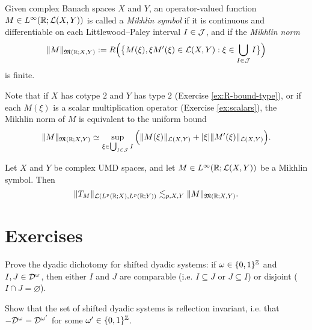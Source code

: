 \begin{defn}
  Given complex Banach spaces $X$ and $Y$, an operator-valued function $M \in L^\infty(\mathbb{R}; \mathcal{L}(X,Y))$ is called a \emph{Mikhlin symbol} if it is continuous and differentiable on each Littlewood--Paley interval $I \in \mathcal{J}$, and if the \emph{Mikhlin norm}
  \begin{equation*}
    \|M\|_{\mathfrak{M}(\mathbb{R};X,Y)} := R \Big( \big\{ M(\xi), \xi M'(\xi) \in \mathcal{L}(X,Y) : \xi \in \bigcup_{I \in \mathcal{J}} I \big\} \Big)
  \end{equation*}
  is finite.
\end{defn}

Note that if $X$ has cotype $2$ and $Y$ has type $2$ (Exercise \ref{ex:R-bound-type}), or if each $M(\xi)$ is a scalar multiplication operator (Exercise \ref{ex:scalars}), the Mikhlin norm of $M$ is equivalent to the uniform bound
\begin{equation*}
  \|M\|_{\mathfrak{M}(\mathbb{R};X,Y)} \simeq \sup_{\xi \in \bigcup_{I \in \mathcal{J}} I} \Big( \|M(\xi)\|_{\mathcal{L}(X,Y)} + |\xi|\|M'(\xi)\|_{\mathcal{L}(X,Y)} \Big).
\end{equation*}

\begin{thm}
  Let $X$ and $Y$ be complex UMD spaces, and let $M \in L^\infty(\mathbb{R};\mathcal{L}(X,Y))$ be a Mikhlin symbol.
  Then
  \begin{equation*}
    \|T_{M}\|_{\mathcal{L}(L^p(\mathbb{R};X), L^p(\mathbb{R};Y))} \lesssim_{p,X,Y} \|M\|_{\mathfrak{M}(\mathbb{R};X,Y)}.
  \end{equation*}
\end{thm}




\section{Exercises}

\begin{exercise}\label{ex:dyadic-dichotomy}
  Prove the dyadic dichotomy for shifted dyadic systems: if $\omega \in \{0,1\}^{\mathbb{Z}}$ and $I,J \in \mathcal{D}^{\omega}$, then either $I$ and $J$ are comparable (i.e. $I \subseteq J$ or $J \subseteq I$) or disjoint ($I \cap J = \varnothing$).
\end{exercise}

\begin{exercise}\label{ex:dyadic-refln-invariance}
  Show that the set of shifted dyadic systems is reflection invariant, i.e. that $-\mathcal{D}^{\omega} = \mathcal{D}^{\omega'}$ for some $\omega' \in \{0,1\}^{\mathbb{Z}}$.
\end{exercise}

